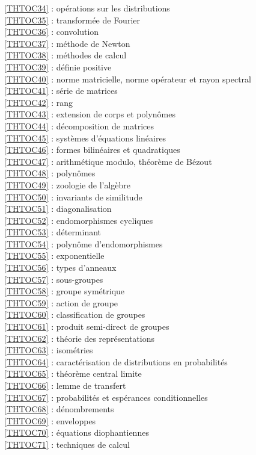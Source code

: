 \ref {THTOC34} : opérations sur les distributions\\
\ref {THTOC35} : transformée de Fourier\\
\ref {THTOC36} : convolution\\
\ref {THTOC37} : méthode de Newton\\
\ref {THTOC38} : méthodes de calcul\\
\ref {THTOC39} : définie positive\\
\ref {THTOC40} : norme matricielle, norme opérateur et rayon spectral\\
\ref {THTOC41} : série de matrices\\
\ref {THTOC42} : rang\\
\ref {THTOC43} : extension de corps et polynômes\\
\ref {THTOC44} : décomposition de matrices\\
\ref {THTOC45} : systèmes d'équations linéaires\\
\ref {THTOC46} : formes bilinéaires et quadratiques\\
\ref {THTOC47} : arithmétique modulo, théorème de Bézout\\
\ref {THTOC48} : polynômes\\
\ref {THTOC49} : zoologie de l'algèbre\\
\ref {THTOC50} : invariants de similitude\\
\ref {THTOC51} : diagonalisation\\
\ref {THTOC52} : endomorphismes cycliques\\
\ref {THTOC53} : déterminant\\
\ref {THTOC54} : polynôme d'endomorphismes\\
\ref {THTOC55} : exponentielle\\
\ref {THTOC56} : types d'anneaux\\
\ref {THTOC57} : sous-groupes\\
\ref {THTOC58} : groupe symétrique\\
\ref {THTOC59} : action de groupe\\
\ref {THTOC60} : classification de groupes\\
\ref {THTOC61} : produit semi-direct de groupes\\
\ref {THTOC62} : théorie des représentations\\
\ref {THTOC63} : isométries\\
\ref {THTOC64} : caractérisation de distributions en probabilités\\
\ref {THTOC65} : théorème central limite\\
\ref {THTOC66} : lemme de transfert\\
\ref {THTOC67} : probabilités et espérances conditionnelles\\
\ref {THTOC68} : dénombrements\\
\ref {THTOC69} : enveloppes\\
\ref {THTOC70} : équations diophantiennes\\
\ref {THTOC71} : techniques de calcul\\
